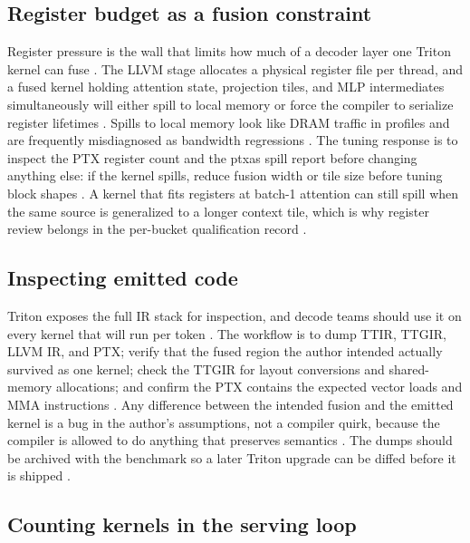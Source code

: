 \subsection{Register budget as a fusion constraint}

Register pressure is the wall that limits how much of a decoder layer one Triton kernel can fuse \citep{nvidia2022hopper,tritonlang2024}. The LLVM stage allocates a physical register file per thread, and a fused kernel holding attention state, projection tiles, and MLP intermediates simultaneously will either spill to local memory or force the compiler to serialize register lifetimes \citep{tritonlang2024,memoryfloor2026}. Spills to local memory look like DRAM traffic in profiles and are frequently misdiagnosed as bandwidth regressions \citep{taxbreak2026,patel2025llminference}. The tuning response is to inspect the PTX register count and the ptxas spill report before changing anything else: if the kernel spills, reduce fusion width or tile size before tuning block shapes \citep{tritonlang2024,nvidia2022hopper}. A kernel that fits registers at batch-1 attention can still spill when the same source is generalized to a longer context tile, which is why register review belongs in the per-bucket qualification record \citep{memoryfloor2026,yirage2026}.

\subsection{Inspecting emitted code}

Triton exposes the full IR stack for inspection, and decode teams should use it on every kernel that will run per token \citep{tritonlang2024}. The workflow is to dump TTIR, TTGIR, LLVM IR, and PTX; verify that the fused region the author intended actually survived as one kernel; check the TTGIR for layout conversions and shared-memory allocations; and confirm the PTX contains the expected vector loads and MMA instructions \citep{chen2020compilerbasedhardw,memoryfloor2026}. Any difference between the intended fusion and the emitted kernel is a bug in the author's assumptions, not a compiler quirk, because the compiler is allowed to do anything that preserves semantics \citep{tritonlang2024,patel2025llminference}. The dumps should be archived with the benchmark so a later Triton upgrade can be diffed before it is shipped \citep{memoryfloor2026,taxbreak2026}.

\subsection{Counting kernels in the serving loop}


